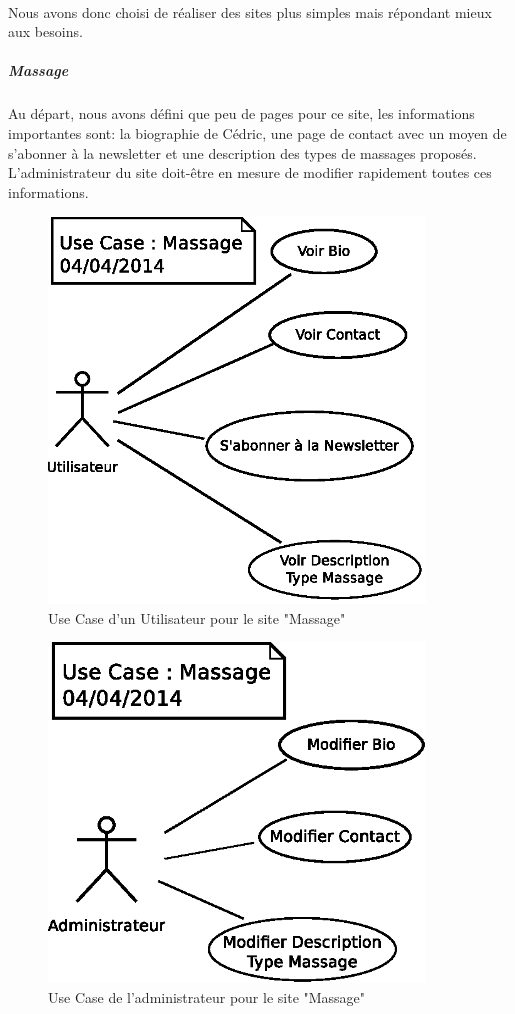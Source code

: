 \documentclass[11pt,a4paper]{report}
\begin{document}
				\paragraph*{}Nous avons donc choisi de réaliser des sites plus simples mais répondant mieux aux besoins.
					\subparagraph*{Massage}Au départ, nous avons défini que peu de pages pour ce site, les informations importantes sont: la biographie de Cédric, une page de contact avec un moyen de s'abonner à la newsletter et une description des types de massages proposés. L'administrateur du site doit-être en mesure de modifier rapidement toutes ces informations.
						\begin{figure}[H]
							\centering
							\includegraphics[width=10cm]{UseCase-Massage-User.eps}
							\caption[Use Case Utilisateur Massage]{Use Case d'un Utilisateur pour le site "Massage"}
							\label{fig:UseCase-Massage User}
						\end{figure}
						\begin{figure}[H]
							\centering
							\includegraphics[width=10cm]{UseCase-Massage-Administrateur.eps}
							\caption[Use Case Administrateur Massage]{Use Case de l'administrateur pour le site "Massage"}
							\label{fig:UseCase-Massage Admin}
						\end{figure}\newpage
\end{document}
